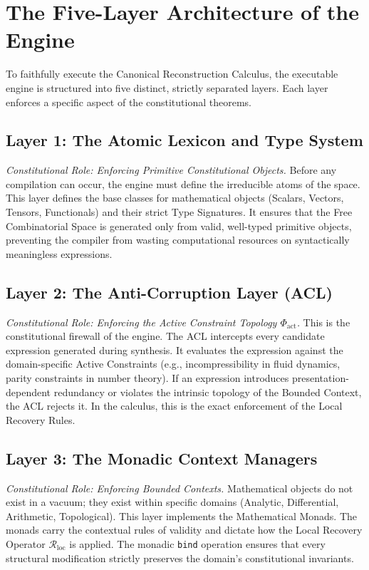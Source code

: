 \documentclass[12pt,openany]{extbook}
\theoremstyle{plain}
\theoremstyle{definition}
\begin{document}
\section{The Five-Layer Architecture of the Engine}

To faithfully execute the Canonical Reconstruction Calculus, the executable engine is structured into five distinct, strictly separated layers. Each layer enforces a specific aspect of the constitutional theorems.

\subsection*{Layer 1: The Atomic Lexicon and Type System}
\emph{Constitutional Role: Enforcing Primitive Constitutional Objects.}
Before any compilation can occur, the engine must define the irreducible atoms of the space. This layer defines the base classes for mathematical objects (Scalars, Vectors, Tensors, Functionals) and their strict Type Signatures. It ensures that the Free Combinatorial Space is generated only from valid, well-typed primitive objects, preventing the compiler from wasting computational resources on syntactically meaningless expressions.

\subsection*{Layer 2: The Anti-Corruption Layer (ACL)}
\emph{Constitutional Role: Enforcing the Active Constraint Topology $\Phi_{\mathrm{act}}$.}
This is the constitutional firewall of the engine. The ACL intercepts every candidate expression generated during synthesis. It evaluates the expression against the domain-specific Active Constraints (e.g., incompressibility in fluid dynamics, parity constraints in number theory). If an expression introduces presentation-dependent redundancy or violates the intrinsic topology of the Bounded Context, the ACL rejects it. In the calculus, this is the exact enforcement of the Local Recovery Rules.

\subsection*{Layer 3: The Monadic Context Managers}
\emph{Constitutional Role: Enforcing Bounded Contexts.}
Mathematical objects do not exist in a vacuum; they exist within specific domains (Analytic, Differential, Arithmetic, Topological). This layer implements the Mathematical Monads. The monads carry the contextual rules of validity and dictate how the Local Recovery Operator $\mathcal{R}_{\mathrm{loc}}$ is applied. The monadic \texttt{bind} operation ensures that every structural modification strictly preserves the domain's constitutional invariants.
\end{document}

